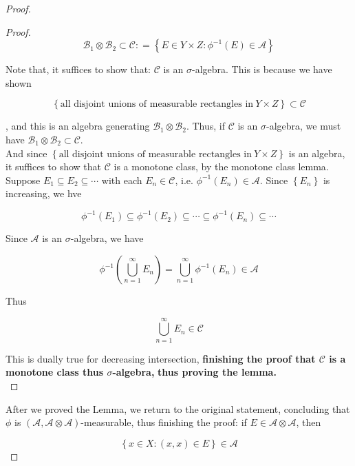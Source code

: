 \documentclass{qlnotes-export}
\begin{document}
\begin{proof}
\begin{proof}
\[\mathcal{B}_{1} \otimes \mathcal{B}_{2} \subset \mathcal{C}: = \left\{ {E \in Y \times Z:\phi^{- 1}(E) \in \mathcal{A}} \right\}\]

Note that, it suffices to show that: \(\mathcal{C}\) is an \(\sigma\)-algebra. This is because we have shown

\[\left\{ {\text{all disjoint unions of measurable rectangles in}\ Y \times Z} \right\} \subset \mathcal{C}\]

, and this is an algebra generating \(\mathcal{B}_{1} \otimes \mathcal{B}_{2}\). Thus, if \(\mathcal{C}\) is an \(\sigma\)-algebra, we must have \(\mathcal{B}_{1} \otimes \mathcal{B}_{2} \subset \mathcal{C}\).\\
And since \(\left\{ {\text{all disjoint unions of measurable rectangles in}\ Y \times Z} \right\}\) is an algebra, it suffices to show that \(\mathcal{C}\) is a monotone class, by the monotone class lemma.\\
Suppose \(E_{1} \subseteq E_{2} \subseteq \cdots\) with each \(E_{n} \in \mathcal{C}\), i.e. \(\phi^{- 1}(E_{n}) \in \mathcal{A}\). Since \(\left\{ E_{n} \right\}\) is increasing, we hve

\[\phi^{- 1}(E_{1}) \subseteq \phi^{- 1}(E_{2}) \subseteq \cdots \subseteq \phi^{- 1}(E_{n}) \subseteq \cdots\]

Since \(\mathcal{A}\) is an \(\sigma\)-algebra, we have

\[\phi^{- 1}(\bigcup\limits_{n = 1}^{\infty}E_{n}) = \bigcup\limits_{n = 1}^{\infty}\phi^{- 1}(E_{n}) \in \mathcal{A}\]

Thus

\[\bigcup\limits_{n = 1}^{\infty}E_{n} \in \mathcal{C}\]

This is dually true for decreasing intersection, \textbf{finishing the proof that \(\mathcal{C}\) is a monotone class thus \(\sigma\)-algebra,} \textbf{thus proving the lemma.}\\

\end{proof}

After we proved the Lemma, we return to the original statement, concluding that \(\phi\) is \((\mathcal{A},\mathcal{A} \otimes \mathcal{A})\)-measurable, thus finishing the proof: if \(E \in \mathcal{A} \otimes \mathcal{A}\), then

\[\left\{ {x \in X:(x,x) \in E} \right\} \in \mathcal{A}\]

\end{proof}
\end{document}
